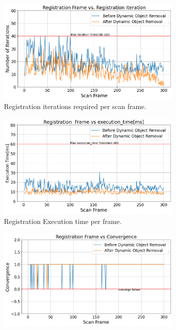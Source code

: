 \begin{figure}[H]
	\centering
	\begin{subfigure}[t]{0.48\textwidth}
		\includegraphics[width=\linewidth]{images/registration_iter_com.png}
		\caption{Registration iterations required per scan frame.}
		\label{fig:reg_iter}
	\end{subfigure}
	\hfill
	\begin{subfigure}[t]{0.48\textwidth}
		\includegraphics[width=\linewidth]{images/registration_exectime_com.png}
		\caption{Registration Execution time per frame.}
		\label{fig:reg_time}
	\end{subfigure}
	\hfill
	\begin{subfigure}[t]{0.48\textwidth}
		\includegraphics[width=\linewidth]{images/registration_conver_comp.png}

\end{subfigure}
\end{figure}
